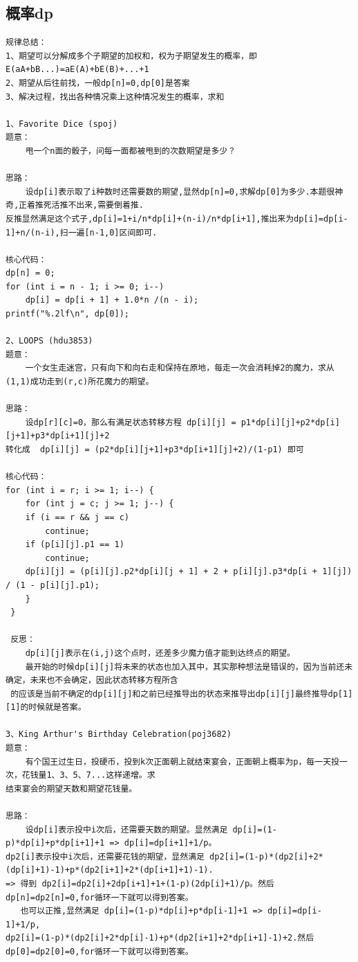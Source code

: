 \documentclass[twoside]{article}
\begin{document}
\subsection{概率dp}
\begin{lstlisting}
规律总结：
1、期望可以分解成多个子期望的加权和，权为子期望发生的概率，即E(aA+bB...)=aE(A)+bE(B)+...+1
2、期望从后往前找，一般dp[n]=0,dp[0]是答案
3、解决过程，找出各种情况乘上这种情况发生的概率，求和

1、Favorite Dice (spoj)
题意：
    甩一个n面的骰子，问每一面都被甩到的次数期望是多少？

思路：
    设dp[i]表示取了i种数时还需要数的期望,显然dp[n]=0,求解dp[0]为多少.本题很神奇,正着推死活推不出来,需要倒着推.
反推显然满足这个式子,dp[i]=1+i/n*dp[i]+(n-i)/n*dp[i+1],推出来为dp[i]=dp[i-1]+n/(n-i),扫一遍[n-1,0]区间即可.

核心代码：
dp[n] = 0;
for (int i = n - 1; i >= 0; i--)
    dp[i] = dp[i + 1] + 1.0*n /(n - i);
printf("%.2lf\n", dp[0]);

2、LOOPS (hdu3853)
题意：
    一个女生走迷宫，只有向下和向右走和保持在原地，每走一次会消耗掉2的魔力，求从(1,1)成功走到(r,c)所花魔力的期望。

思路：
    设dp[r][c]=0，那么有满足状态转移方程 dp[i][j] = p1*dp[i][j]+p2*dp[i][j+1]+p3*dp[i+1][j]+2
转化成  dp[i][j] = (p2*dp[i][j+1]+p3*dp[i+1][j]+2)/(1-p1) 即可

核心代码：
for (int i = r; i >= 1; i--) {
    for (int j = c; j >= 1; j--) {
	if (i == r && j == c)
		continue;
	if (p[i][j].p1 == 1)
		continue;
	dp[i][j] = (p[i][j].p2*dp[i][j + 1] + 2 + p[i][j].p3*dp[i + 1][j]) / (1 - p[i][j].p1);
    }
 }
   
 反思：
    dp[i][j]表示在(i,j)这个点时，还差多少魔力值才能到达终点的期望。
    最开始的时候dp[i][j]将未来的状态也加入其中，其实那种想法是错误的，因为当前还未确定，未来也不会确定，因此状态转移方程所含
 的应该是当前不确定的dp[i][j]和之前已经推导出的状态来推导出dp[i][j]最终推导dp[1][1]的时候就是答案。
 
3、King Arthur's Birthday Celebration(poj3682)
题意：
    有个国王过生日，投硬币，投到k次正面朝上就结束宴会，正面朝上概率为p，每一天投一次，花钱量1、3、5、7...这样递增。求
结束宴会的期望天数和期望花钱量。

思路：
    设dp[i]表示投中i次后，还需要天数的期望。显然满足 dp[i]=(1-p)*dp[i]+p*dp[i+1]+1 => dp[i]=dp[i+1]+1/p。 
dp2[i]表示投中i次后，还需要花钱的期望，显然满足 dp2[i]=(1-p)*(dp2[i]+2*(dp[i]+1)-1)+p*(dp2[i+1]+2*(dp[i+1]+1)-1).
=> 得到 dp2[i]=dp2[i]+2dp[i+1]+1+(1-p)(2dp[i]+1)/p。然后dp[n]=dp2[n]=0,for循环一下就可以得到答案。
   也可以正推,显然满足 dp[i]=(1-p)*dp[i]+p*dp[i-1]+1 => dp[i]=dp[i-1]+1/p,
dp2[i]=(1-p)*(dp2[i]+2*dp[i]-1)+p*(dp2[i+1]+2*dp[i+1]-1)+2.然后dp[0]=dp2[0]=0,for循环一下就可以得到答案。


\end{lstlisting}
\end{document}
